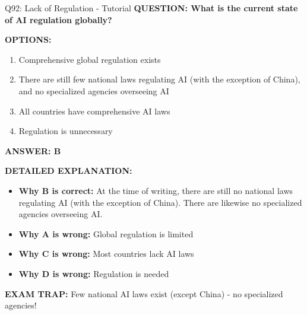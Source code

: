 \documentclass[8pt]{beamer}
\begin{document}
	\begin{frame}{Q92: Lack of Regulation - Tutorial}
		\fontsize{6.5}{7.5}\selectfont
		\textbf{QUESTION: What is the current state of AI regulation globally?}
		
		\vspace{0.1cm}
		\textbf{OPTIONS:}
		\begin{enumerate}
			\item Comprehensive global regulation exists
			\item There are still few national laws regulating AI (with the exception of China), and no specialized agencies overseeing AI
			\item All countries have comprehensive AI laws
			\item Regulation is unnecessary
		\end{enumerate}
		
		\vspace{0.1cm}
		\textcolor{myblue}{\textbf{ANSWER: B}}
		
		\vspace{0.1cm}
		\textbf{DETAILED EXPLANATION:}
		\begin{itemize}
			\item \textbf{Why B is correct:} At the time of writing, there are still no national laws regulating AI (with the exception of China). There are likewise no specialized agencies overseeing AI.
			\item \textbf{Why A is wrong:} Global regulation is limited
			\item \textbf{Why C is wrong:} Most countries lack AI laws
			\item \textbf{Why D is wrong:} Regulation is needed
		\end{itemize}
		
		\textcolor{myred}{\textbf{EXAM TRAP:}} Few national AI laws exist \textcolor{myblue}{(except China)} - no specialized agencies!
	\end{frame}
	
\end{document}
